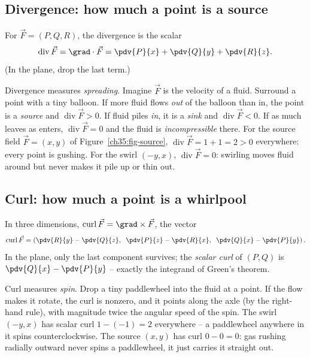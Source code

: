 \subsection{Divergence: how much a point is a source}

\begin{definition}[Divergence]
\label{ch35:def-div}
For $\vec F=(P,Q,R)$, the divergence is the scalar
\[
  \operatorname{div}\vec F = \grad\cdot\vec F = \pdv{P}{x} + \pdv{Q}{y} + \pdv{R}{z}.
\]
(In the plane, drop the last term.)
\end{definition}

\begin{intuitionbox}
Divergence measures \emph{spreading}. Imagine $\vec F$ is the velocity of a fluid.
Surround a point with a tiny balloon. If more fluid flows \emph{out} of the balloon
than in, the point is a \emph{source} and $\operatorname{div}\vec F>0$. If fluid piles
\emph{in}, it is a \emph{sink} and $\operatorname{div}\vec F<0$. If as much leaves as
enters, $\operatorname{div}\vec F=0$ and the fluid is \emph{incompressible} there.
For the source field $\vec F=(x,y)$ of Figure~\ref{ch35:fig-source},
$\operatorname{div}\vec F = 1+1 = 2 > 0$ everywhere: every point is gushing. For the
swirl $(-y,x)$, $\operatorname{div}\vec F = 0$: swirling moves fluid around but never
makes it pile up or thin out.
\end{intuitionbox}

\subsection{Curl: how much a point is a whirlpool}

\begin{definition}[Curl]
\label{ch35:def-curl}
In three dimensions, $\operatorname{curl}\vec F = \grad\times\vec F$, the vector
\[
  \operatorname{curl}\vec F =
  \left(\pdv{R}{y}-\pdv{Q}{z},\;\; \pdv{P}{z}-\pdv{R}{x},\;\; \pdv{Q}{x}-\pdv{P}{y}\right).
\]
In the plane, only the last component survives; the \emph{scalar curl} of
$(P,Q)$ is $\pdv{Q}{x}-\pdv{P}{y}$ -- exactly the integrand of Green's theorem.
\end{definition}

\begin{intuitionbox}
Curl measures \emph{spin}. Drop a tiny paddlewheel into the fluid at a point. If
the flow makes it rotate, the curl is nonzero, and it points along the axle (by
the right-hand rule), with magnitude twice the angular speed of the spin. The
swirl $(-y,x)$ has scalar curl $1-(-1)=2$ everywhere -- a paddlewheel anywhere in
it spins counterclockwise. The source $(x,y)$ has curl $0-0=0$: gas rushing
radially outward never spins a paddlewheel, it just carries it straight out.
\end{intuitionbox}

